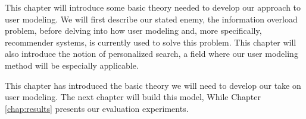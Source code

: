 \label{chap:theory}

This chapter will introduce some basic theory needed to develop our approach to user modeling.
We will first describe our stated enemy, the information overload problem, before delving into
how user modeling and, more specifically, recommender systems, is currently used to solve this problem.
This chapter will also introduce the notion of personalized search, a field where
our user modeling method will be especially applicable.






 
\hr

\noindent
This chapter has introduced the basic theory we will need to develop our take on user modeling.
The next chapter will build this model,
While Chapter \ref{chap:results} presents our evaluation experiments.


